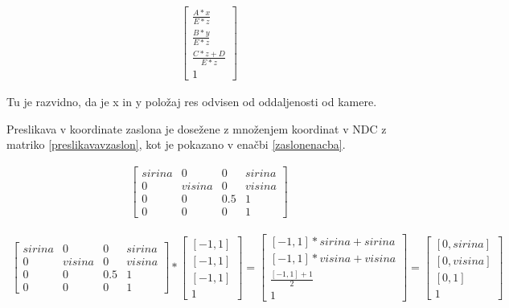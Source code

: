 \documentclass[a4paper, 12pt]{book}
\begin{document}
\begin{align}
\begin{bmatrix}
\frac{A*x}{E*z} \\ 
\frac{B*y}{E*z} \\
\frac{C*z+D}{E*z} \\
1
\end{bmatrix}
\label{perspectivehomogenous}
\end{align}

Tu je razvidno, da je x in y položaj res odvisen od oddaljenosti od kamere.

Preslikava v koordinate zaslona je dosežene z množenjem koordinat v NDC z matriko \ref{preslikavavzaslon}, kot je pokazano v enačbi \ref{zaslonenacba}.

\begin{align}
\begin{bmatrix}
sirina & 0 & 0 & sirina \\ 
0 & visina & 0 & visina \\ 
0 & 0 & 0.5 & 1 \\ 
0 & 0 & 0 & 1
\end{bmatrix}
\label{preslikavavzaslon}
\end{align}

\begin{align}
\begin{bmatrix}
sirina & 0 & 0 & sirina \\ 
0 & visina & 0 & visina \\ 
0 & 0 & 0.5 & 1 \\ 
0 & 0 & 0 & 1
\end{bmatrix}
*
\begin{bmatrix}
[-1, 1] \\ [-1, 1] \\ [-1, 1] \\ 1
\end{bmatrix}
=
\begin{bmatrix}
[-1, 1]*sirina + sirina \\
[-1, 1]*visina + visina \\
\frac{[-1, 1]+1}{2} \\
1
\end{bmatrix}
=
\begin{bmatrix}
[0, sirina] \\
[0, visina] \\
[0, 1] \\
1
\end{bmatrix}
\label{zaslonenacba}
\end{align}
\end{document}
